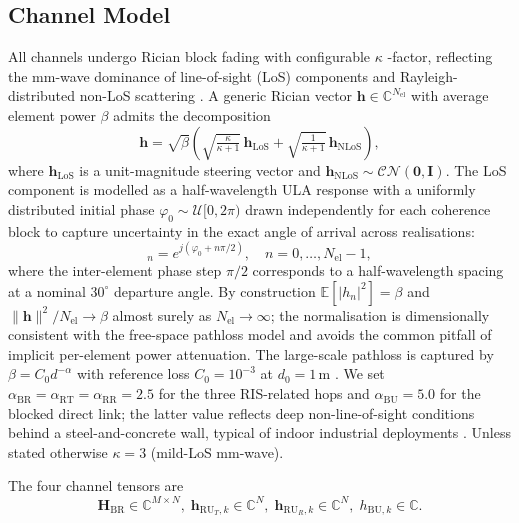 \documentclass[journal]{IEEEtran}
\newcommand{\vect}[1]{\bm{#1}}
\newcommand{\mat}[1]{\mathbf{#1}}
\newcommand{\E}{\mathbb{E}}
\newcommand{\C}{\mathbb{C}}
\newcommand{\cn}{\mathcal{CN}}
\begin{document}
\subsection{Channel Model}
\label{sec:channel}

All channels undergo Rician block fading with configurable $\kappa$%
-factor, reflecting the mm-wave dominance of line-of-sight (LoS)
components and Rayleigh-distributed non-LoS scattering
\cite{tse2005fundamentals}. A generic Rician vector
$\vect{h}\!\in\!\C^{N_{\mathrm{el}}}$ with average element power
$\beta$ admits the decomposition
\begin{equation}
  \vect{h}=\sqrt{\beta}\!\left(\!\sqrt{\tfrac{\kappa}{\kappa+1}}\,\vect{h}_{\mathrm{LoS}}
  +\sqrt{\tfrac{1}{\kappa+1}}\,\vect{h}_{\mathrm{NLoS}}\!\right),
  \label{eq:rician}
\end{equation}
where $\vect{h}_{\mathrm{LoS}}$ is a unit-magnitude steering vector
and $\vect{h}_{\mathrm{NLoS}}\!\sim\!\cn(\vect{0},\mat{I})$. The LoS
component is modelled as a half-wavelength ULA response with a
uniformly distributed initial phase $\varphi_0\!\sim\!\mathcal{U}[0,2\pi)$
drawn independently for each coherence block to capture uncertainty
in the exact angle of arrival across realisations:
\begin{equation}
  [\vect{h}_{\mathrm{LoS}}]_n=
     e^{j(\varphi_0 + n\pi/2)},\quad n=0,\ldots,N_{\mathrm{el}}-1,
  \label{eq:steering}
\end{equation}
where the inter-element phase step $\pi/2$ corresponds to a
half-wavelength spacing at a nominal $30^{\circ}$ departure angle.
By construction $\E[|h_n|^2]=\beta$ and $\|\vect{h}\|^2 / N_{\mathrm{el}}
\to \beta$ almost surely as $N_{\mathrm{el}}\!\to\!\infty$; the
normalisation is dimensionally consistent with the free-space
pathloss model and avoids the common pitfall of implicit
per-element power attenuation. The large-scale pathloss is captured
by $\beta=C_0 d^{-\alpha}$ with reference loss $C_0=10^{-3}$ at
$d_0=1\,\text{m}$ \cite{paul2024active}. We set
$\alpha_{\mathrm{BR}}=\alpha_{\mathrm{RT}}=\alpha_{\mathrm{RR}}=2.5$
for the three RIS-related hops and $\alpha_{\mathrm{BU}}=5.0$ for the
blocked direct link; the latter value reflects deep non-line-of-sight
conditions behind a steel-and-concrete wall, typical of indoor
industrial deployments \cite{rappaport2014mmwave}. Unless stated
otherwise $\kappa=3$ (mild-LoS mm-wave).

The four channel tensors are
\begin{equation}
  \mat{H}_{\mathrm{BR}}\!\in\!\C^{M\!\times\!N},\;
  \vect{h}_{\mathrm{RU}_T\!,k}\!\in\!\C^N,\;
  \vect{h}_{\mathrm{RU}_R\!,k}\!\in\!\C^N,\;
  h_{\mathrm{BU},k}\!\in\!\C.
  \label{eq:ch_tensors}
\end{equation}
\end{document}
